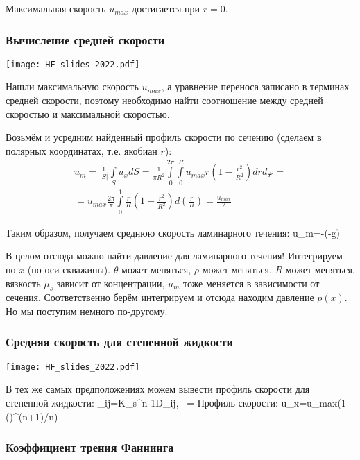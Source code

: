 \documentclass[main.tex]{subfiles}
\begin{document}
Максимальная скорость $u_{max}$ достигается при $r=0$.

\subsubsection{Вычисление средней скорости}

\texttt{[image: HF\_slides\_2022.pdf]}

Нашли максимальную скорость $u_{max}$, а уравнение переноса записано в терминах средней скорости, поэтому необходимо найти соотношение между средней скоростью и максимальной скоростью.

Возьмём и усредним найденный профиль скорости по сечению (сделаем в полярных координатах, т.е. якобиан $r$):
\begin{multline}
u_m=\frac{1}{|S|}\int\limits_S{u_xdS}=\frac{1}{\pi R^2}\int\limits_{0}^{2\pi}\int\limits_{0}^{R}u_{max}r\left(1-\frac{r^2}{R^2}\right)drd\varphi=\\=u_{max}\frac{2\pi}{\pi}\int\limits_0^1\frac{r}{R}\left(1-\frac{r^2}{R^2}\right)d\left(\frac{r}{R}\right)=\frac{u_{max}}{2}
\end{multline}

Таким образом, получаем среднюю скорость ламинарного течения:
\beq
u_m=-\left(-\rho g\sin{\theta}\right)
\eeq

В целом отсюда можно найти давление для ламинарного течения!
Интегрируем по $x$ (по оси скважины).
$\theta$ может меняться, $\rho$ может меняться, $R$ может меняться, вязкость $\mu_s$ зависит от концентрации, $u_m$ тоже меняется в зависимости от сечения.
Соответственно берём интегрируем и отсюда находим давление $p(x)$.
Но мы поступим немного по-другому.

\subsubsection{Средняя скорость для степенной жидкости}

\texttt{[image: HF\_slides\_2022.pdf]}

В тех же самых предположениях можем вывести профиль скорости для степенной жидкости:
\beq
\tau_{ij}=K_s\dot{\gamma}^{n-1}D_{ij},\,\,\,\,\,\dot{\gamma}=
\eeq
Профиль скорости:
\beq
u_x=u_{max}\left(1-\left(\right)^{(n+1)/n}\right)
\eeq
\ \\

\subsubsection{Коэффициент трения Фаннинга}
\end{document}
